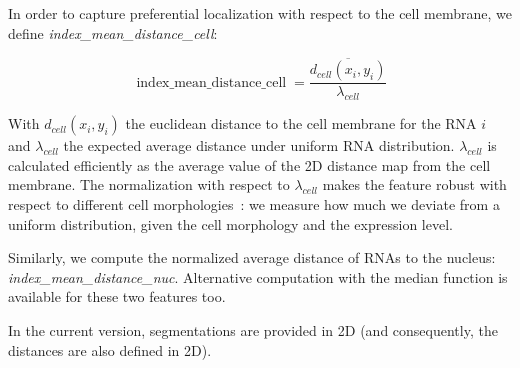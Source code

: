 


In order to capture preferential localization with respect to the cell membrane, we define \emph{index\_mean\_distance\_cell}: 


\begin{equation}
	{\displaystyle \operatorname{index\_mean\_distance\_cell} = \frac{\overline{d_{cell}(x_i, y_i)}}{\lambda_{cell}}}
\end{equation}

\noindent
With $d_{cell}(x_i, y_i)$ the euclidean distance to the cell membrane for the \ac{RNA} $i$ and $\lambda_{cell}$ the expected average distance under uniform \ac{RNA} distribution. $\lambda_{cell}$ is calculated efficiently as the average value of the 2D distance map from the cell membrane. The normalization with respect to $\lambda_{cell}$ makes the feature robust with respect to different cell morphologies~\cite{samacoits_computational_2018}: we measure how much we deviate from a uniform distribution, given the cell morphology and the expression level. 


Similarly, we compute the normalized average distance of \ac{RNA}s to the nucleus: \emph{index\_mean\_distance\_nuc}.
Alternative computation with the median function is available for these two features too.

In the current version, segmentations are provided in 2D (and consequently, the distances are also defined in 2D).


